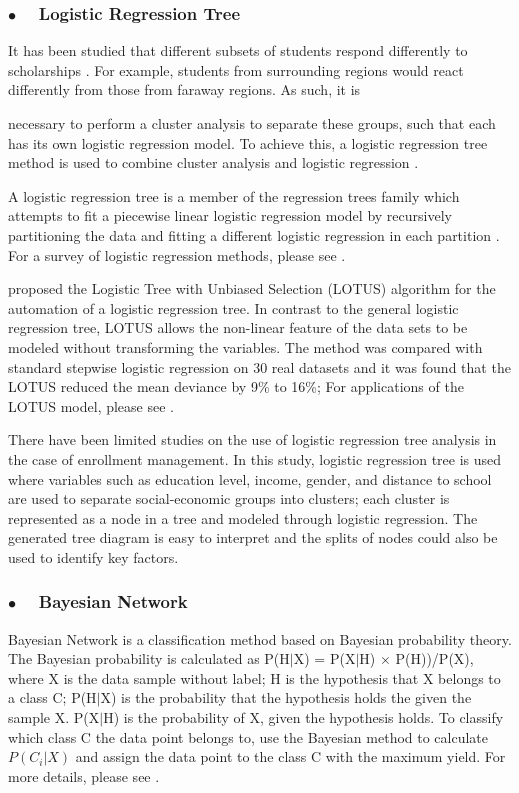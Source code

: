 \documentclass[12pt,english]{report}
\begin{document}
\subsubsection{$\bullet \quad$  Logistic Regression Tree}

It has been studied that different subsets of students respond differently to 
scholarships \citep{Curs2002, Heller1999}. For example, students from
surrounding 
regions would react differently from those from faraway regions. As such, it is

necessary to perform a cluster analysis to separate these groups, such that
each has 
its own logistic regression model. To achieve this, a logistic regression tree 
method is used to combine cluster analysis and logistic regression
\citep{Loh2011}.

A logistic regression tree is a member of the regression trees family which
attempts 
to fit a piecewise linear logistic regression model by recursively partitioning
the 
data and fitting a different logistic regression in each partition
\citep{lotus2}. 
For a survey of logistic regression methods, please see 
\citep{harrell2013regression_book}.
    
\citet{lotus2} proposed the Logistic Tree with Unbiased Selection (LOTUS)
algorithm for 
the automation of a logistic regression tree. In contrast to the general
logistic 
regression tree, LOTUS allows the non-linear feature of the data sets to be
modeled 
without transforming the variables. The method was compared with standard
stepwise 
logistic regression on 30 real datasets and it was found that the LOTUS reduced
the 
mean deviance by 9\% to 16\%;  For applications of the LOTUS model, please see 
\citep{lotus_app1,lotus_app2}.

There have been limited studies on the use of logistic regression tree analysis
in 
the case of enrollment management. 
In this study, logistic regression tree is used where variables such as
education 
level, income, gender, and distance to school are used to separate
social-economic 
groups into clusters; each cluster is represented as a node in a tree and
modeled 
through logistic regression. The generated tree diagram is easy to interpret
and the 
splits of nodes could also be used to identify key factors.


\subsubsection {$\bullet \quad$ Bayesian Network}
Bayesian Network is a classification method based on Bayesian probability 
theory. The Bayesian probability is calculated as P(H$|$X) = P(X$|$H) $\times$ 
P(H))/P(X), where X is the data sample without label; H is the hypothesis that 
X belongs to a class C; P(H$|$X) is the probability that 
the hypothesis holds the given the sample X. P(X$|$H) is the probability of X, 
given the  hypothesis holds. To classify which class C the data point belongs 
to, use the Bayesian method to  calculate $P(C_i|X)$ and assign the data point 
to the class C with the maximum yield. For more details, please see 
\citep{demuth2014neural}.
\end{document}

